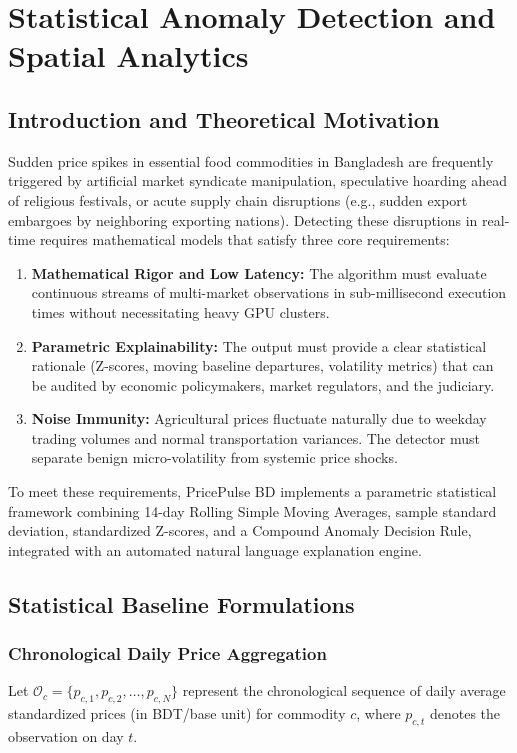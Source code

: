 \chapter{Statistical Anomaly Detection and Spatial Analytics}
\label{ch:anomaly_engine}

\section{Introduction and Theoretical Motivation}
Sudden price spikes in essential food commodities in Bangladesh are frequently triggered by artificial market syndicate manipulation, speculative hoarding ahead of religious festivals, or acute supply chain disruptions (e.g., sudden export embargoes by neighboring exporting nations). Detecting these disruptions in real-time requires mathematical models that satisfy three core requirements:
\begin{enumerate}
    \item \textbf{Mathematical Rigor and Low Latency:} The algorithm must evaluate continuous streams of multi-market observations in sub-millisecond execution times without necessitating heavy GPU clusters.
    \item \textbf{Parametric Explainability:} The output must provide a clear statistical rationale (Z-scores, moving baseline departures, volatility metrics) that can be audited by economic policymakers, market regulators, and the judiciary.
    \item \textbf{Noise Immunity:} Agricultural prices fluctuate naturally due to weekday trading volumes and normal transportation variances. The detector must separate benign micro-volatility from systemic price shocks.
\end{enumerate}

To meet these requirements, PricePulse BD implements a parametric statistical framework combining 14-day Rolling Simple Moving Averages, sample standard deviation, standardized Z-scores, and a Compound Anomaly Decision Rule, integrated with an automated natural language explanation engine.

\section{Statistical Baseline Formulations}

\subsection{Chronological Daily Price Aggregation}
Let $\mathcal{O}_c = \{p_{c,1}, p_{c,2}, \dots, p_{c,N}\}$ represent the chronological sequence of daily average standardized prices (in BDT/base unit) for commodity $c$, where $p_{c,t}$ denotes the observation on day $t$.

